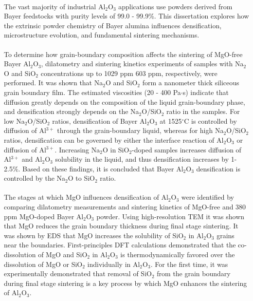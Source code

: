 \paragraph*{} The vast majority of industrial Al$_{2}$O$_{3}$ applications use powders derived from Bayer feedstocks with purity levels of 99.0 - 99.9\%. This dissertation explores how the extrinsic powder chemistry of Bayer alumina influences densification, microstructure evolution, and fundamental sintering mechanisms.
\paragraph*{} To determine how grain-boundary composition affects the sintering of MgO-free Bayer Al$_{2}$O$_{3}$, dilatometry and sintering kinetics experiments of samples with Na$_{2}$O and SiO$_{2}$ concentrations up to 1029 ppm 603 ppm, respectively, were performed. It was shown that Na$_{2}$O and SiO$_{2}$ form a nanometer thick siliceous grain boundary film. The estimated viscosities (20 - 400 Pa$\cdot$s) indicate that diffusion greatly depends on the composition of the liquid grain-boundary phase, and densification strongly depends on the Na$_{2}$O/SiO$_{2}$ ratio in the samples. For low Na$_{2}$O/SiO$_{2}$ ratios, densification of Bayer Al$_{2}$O$_{3}$ at 1525$^{\circ}$C is controlled by diffusion of Al$^{3+}$ through the grain-boundary liquid, whereas for high Na$_{2}$O/SiO$_{2}$ ratios, densification can be governed by either the interface reaction of Al$_{2}$O$_{3}$ or diffusion of Al$^{3+}$. Increasing Na$_{2}$O in SiO$_{2}$-doped samples increases diffusion of Al$^{3+}$ and Al$_{2}$O$_{3}$ solubility in the liquid, and thus densification increases by 1-2.5\%. Based on these findings, it is concluded that Bayer Al$_{2}$O$_{3}$ densification is controlled by the Na$_{2}$O to SiO$_{2}$ ratio. 
\paragraph*{} The stages at which MgO influences densification of Al$_{2}$O$_{3}$ were identified by comparing dilatometry measurements and sintering kinetics of MgO-free and 380 ppm MgO-doped Bayer Al$_{2}$O$_{3}$ powder. Using high-resolution TEM it was shown that MgO reduces the grain boundary thickness during final stage sintering. It was shown by EDS that MgO increases the solubility of SiO$_{2}$ in Al$_{2}$O$_{3}$ grains near the boundaries. First-principles DFT calculations demonstrated that the co-dissolution of MgO and SiO$_{2}$ in Al$_{2}$O$_{3}$ is thermodynamically favored over the dissolution of MgO or SiO$_{2}$ individually in Al$_{2}$O$_{3}$. For the first time, it was experimentally demonstrated that removal of SiO$_{2}$ from the grain boundary during final stage sintering is a key process by which MgO enhances the sintering of Al$_{2}$O$_{3}$. 
